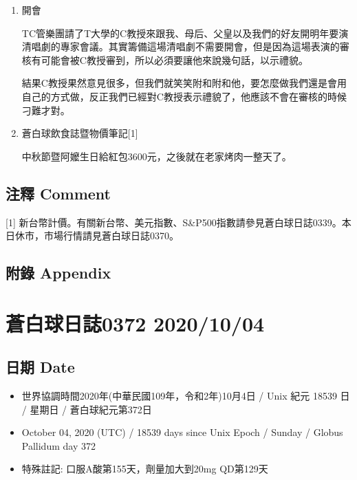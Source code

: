 \documentclass[
]{article}
\providecommand{\tightlist}{%
  \setlength{\itemsep}{0pt}\setlength{\parskip}{0pt}}
\begin{document}
\begin{enumerate}
\def\labelenumi{\arabic{enumi}.}
\item
  開會

  TC管樂團請了T大學的C教授來跟我、母后、父皇以及我們的好友開明年要演清唱劇的專家會議。其實籌備這場清唱劇不需要開會，但是因為這場表演的審核有可能會被C教授審到，所以必須要讓他來說幾句話，以示禮貌。

  結果C教授果然意見很多，但我們就笑笑附和附和他，要怎麼做我們還是會用自己的方式做，反正我們已經對C教授表示禮貌了，他應該不會在審核的時候刁難才對。
\item
  蒼白球飲食誌暨物價筆記{[}1{]}

  中秋節暨阿嬤生日給紅包3600元，之後就在老家烤肉一整天了。
\end{enumerate}

\hypertarget{ux6ce8ux91cb-comment-30}{%
\subsection{注釋 Comment}\label{ux6ce8ux91cb-comment-30}}

{[}1{]}
新台幣計價。有關新台幣、美元指數、S\&P500指數請參見蒼白球日誌0339。本日休市，市場行情請見蒼白球日誌0370。

\hypertarget{ux9644ux9304-appendix-30}{%
\subsection{附錄 Appendix}\label{ux9644ux9304-appendix-30}}

\hypertarget{ux84bcux767dux7403ux65e5ux8a8c0372-20201004}{%
\section{蒼白球日誌0372
2020/10/04}\label{ux84bcux767dux7403ux65e5ux8a8c0372-20201004}}

\hypertarget{ux65e5ux671f-date-31}{%
\subsection{日期 Date}\label{ux65e5ux671f-date-31}}

\begin{itemize}
\tightlist
\item
  世界協調時間2020年(中華民國109年，令和2年)10月4日 / Unix 紀元 18539 日
  / 星期日 / 蒼白球紀元第372日
\item
  October 04, 2020 (UTC) / 18539 days since Unix Epoch / Sunday / Globus
  Pallidum day 372
\item
  特殊註記: 口服A酸第155天，劑量加大到20mg QD第129天
\end{itemize}
\end{document}
